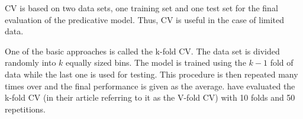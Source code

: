 CV is based on two data sets, one training set and one test set for the final evaluation of the predicative model. Thus, CV is useful in the case of limited data. 

One of the basic approaches is called the k-fold CV. The data set is divided randomly into $k$ equally sized bins. The model is trained using the $k-1$ fold of data while the last one is used for testing. This procedure is then repeated many times over and the final performance is given as the average. \citet{Krstajic2014} have evaluated the k-fold CV (in their article referring to it as the V-fold CV) with 10 folds and 50 repetitions. 




\begin{comment}
\section{Attack Graphs}
Attack Graphs are graphs where vulnerabilities and exploits are represented, thus making it a tool to assess the security of enterprise networks \cite{barik2016}. The concept of attack graphs was introduced in 1998 

\subsection{Regular equivalence}
In some cases it is of interest to understand the similarity in position that nodes represent in a network.  It is then useful to study the regular equivalence between nodes. In the context of a social network of a company, two nodes representing managers over two different departments should according to regular equivalence give a high value of similarity. 

In other words, two nodes are regularly equivalent if they are equally related to equivalent others. This implies an iterative or recursive nature since the similarity between the neighborhoods of the nodes has to be known before the similarity of the nodes themselves can be computed \cite{leicht2006}. 

One way of retrieving an exact solution of the regular equivalence is the 
One algorithm to determine the regular equivalence is REGE. 

While REGE is applicable to quantitative data, CATREGE is used for categorical data. 

\section{Kernels on a Graph}


\end{comment}
